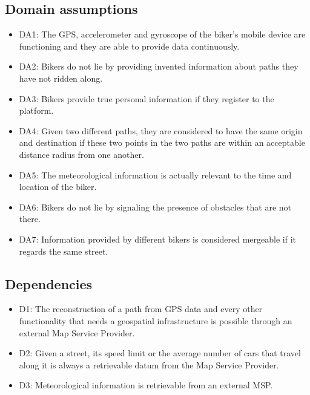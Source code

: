 \documentclass{article}
\begin{document}
\subsection{Domain assumptions}
\begin{itemize}
    \item DA1: The GPS, accelerometer and gyroscope of the biker's mobile device are functioning and they are able to provide data continuously.
    \item DA2: Bikers do not lie by providing invented information about paths they have not ridden along.
    \item DA3: Bikers provide true personal information if they register to the platform.
    \item DA4: Given two different paths, they are considered to have the same origin and destination if these two points in the two paths are within an acceptable distance radius from one another. 
    \item DA5: The meteorological information is actually relevant to the time and location of the biker.
    \item DA6: Bikers do not lie by signaling the presence of obstacles that are not there.
    \item DA7: Information provided by different bikers is considered mergeable if it regards the same street.
\end{itemize}

\subsection{Dependencies} %
\begin{itemize}
    \item D1: The reconstruction of a path from GPS data and every other functionality that needs a geospatial infrastructure is possible through an external Map Service Provider.
    \item D2: Given a street, its speed limit or the average number of cars that travel along it is always a retrievable datum from the Map Service Provider.
    \item D3: Meteorological information is retrievable from an external MSP.
\end{itemize}
\end{document}
